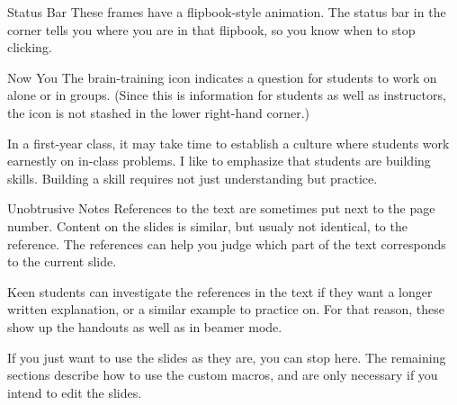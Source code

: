 \documentclass[10pt]{beamer}
\begin{document}
\begin{frame}{Status Bar}
These frames have a  flipbook-style animation. The status bar in the corner tells you where you are in that flipbook, so you know when to stop clicking.

\begin{center}
\end{center}
\end{frame}
\begin{frame}{Now You}
\NowYou The brain-training icon indicates a question for students to work on alone or in groups.
(Since this is information for students as well as instructors, the icon is not stashed in the lower right-hand corner.)
\vfill

In a first-year class, it may take time to establish a culture where students work earnestly on in-class problems. I like to emphasize that students are building skills. Building a skill requires not just understanding but practice.
\end{frame}
\begin{frame}{Unobtrusive Notes}
References to the text are sometimes put next to the page number. 
Content on the slides is similar, but usualy not identical, to the reference. The references can help you judge which part of the text corresponds to the current slide.
\vfill

Keen students can investigate the references in the text if they want a longer written explanation, or a similar example to practice on. For that reason, these show up the handouts as well as in beamer mode. 
\end{frame}
\begin{frame}
If you just want to use the slides as they are, you can stop here. 
\vfill
The remaining sections describe how to use the custom macros, and are only necessary if you intend to \alert{edit} the slides.
\end{frame}
\end{document}
